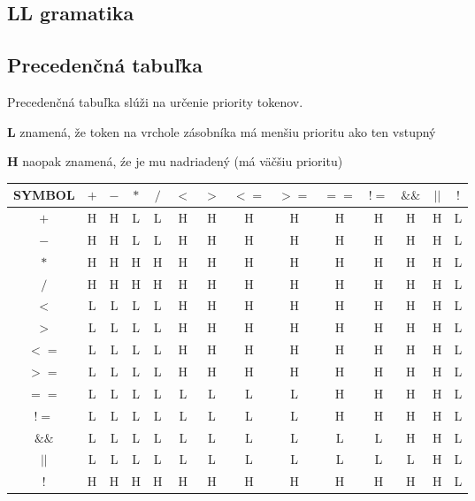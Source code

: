 \documentclass[12pt, a4paper]{article}
\begin{document}
        \subsection{LL gramatika}
        
        \subsection{Precedenčná tabuľka} \label{sec:tab}
        Precedenčná tabuľka slúži na určenie priority tokenov.
        
        \textbf{L} znamená, že token na vrchole zásobníka má menšiu prioritu ako ten vstupný
        
        \textbf{H} naopak znamená, źe je mu nadriadený (má väčšiu prioritu)
        
        \begin{center}
            \begin{tabular}{| c | c | c | c | c | c | c | c | c | c | c | c | c | c |}
            \hline
            SYMBOL & $+$ & $-$ & $*$ & $/$ & $<$ & $>$ & $<=$ & $>=$ & $==$ & $!=$ & $\&\&$ & $||$ & $!$\\
            \hline
            $+$ & H & H & L & L & H & H & H & H & H & H & H & H & L\\
            $-$ & H & H & L & L & H & H & H & H & H & H & H & H & L\\
            $*$ & H & H & H & H & H & H & H & H & H & H & H & H & L\\
            $/$ & H & H & H & H & H & H & H & H & H & H & H & H & L\\
            $<$ & L & L & L & L & H & H & H & H & H & H & H & H & L\\
            $>$ & L & L & L & L & H & H & H & H & H & H & H & H & L\\
            $<=$ & L & L & L & L & H & H & H & H & H & H & H & H & L\\
            $>=$ & L & L & L & L & H & H & H & H & H & H & H & H & L\\
            $==$ & L & L & L & L & L & L & L & L & H & H & H & H & L\\
            $!=$ & L & L & L & L & L & L & L & L & H & H & H & H & L\\
            $\&\&$ & L & L & L & L & L & L & L & L & L & L & H & H & L\\
            $||$ & L & L & L & L & L & L & L & L & L & L & L & H & L\\
            $!$ & H & H & H & H & H & H & H & H & H & H & H & H & L\\
            \hline
            \end{tabular}
        \end{center}
\end{document}
